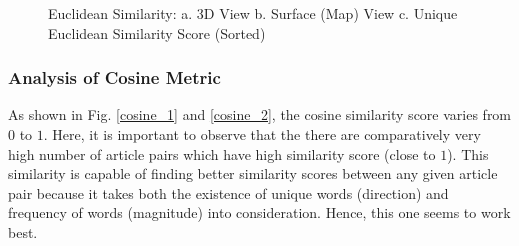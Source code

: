 \documentclass[journal,onecolumn]{IEEEtran}
\begin{document}
\begin{figure}[h]
\begin{center}
\label{thr}
\caption{  Euclidean Similarity: a. 3D View  b. Surface (Map) View  c. Unique Euclidean Similarity Score (Sorted)}
\end{center}
\end{figure}

\subsubsection{\textbf{Analysis of Cosine Metric}}
As shown in Fig. \ref{cosine_1} and \ref{cosine_2}, the cosine similarity score varies from $0$ to $1$. Here, it is important to observe that the there are comparatively very high number of article pairs which have high similarity score  (close to $1$). This similarity is capable of finding better similarity scores between any given article pair because it takes both the existence of unique words (direction) and frequency of words (magnitude) into consideration. Hence, this one seems to work best.
\end{document}
